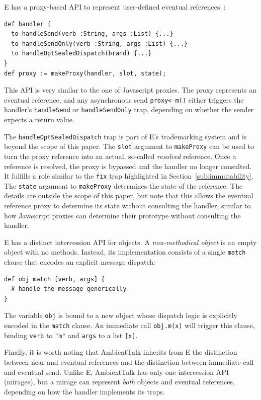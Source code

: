 \documentclass{acm_proc_article-sp}
\begin{document}
E has a proxy-based API to represent user-defined eventual references~\cite{eproxies}:

\begin{lstlisting}[]
def handler {
  to handleSend(verb :String, args :List) {...}
  to handleSendOnly(verb :String, args :List) {...}
  to handleOptSealedDispatch(brand) {...}
}
def proxy := makeProxy(handler, slot, state);
\end{lstlisting}

This API is very similar to the one of Javascript proxies. The proxy represents an eventual reference, and any asynchronous send \texttt{proxy<-m()} either triggers the handler's \texttt{handleSend} or \texttt{handleSendOnly} trap, depending on whether the sender expects a return value.

The \texttt{handleOptSealedDispatch} trap is part of E's trademarking system and is beyond the scope of this paper. The \texttt{slot} argument to \texttt{makeProxy} can be used to turn the proxy reference into an actual, so-called \emph{resolved} reference. Once a reference is resolved, the proxy is bypassed and the handler no longer consulted. It fulfills a role similar to the \texttt{fix} trap highlighted in Section~\ref{sub:immutability}. The \texttt{state} argument to \texttt{makeProxy} determines the state of the reference. The details are outside the scope of this paper, but note that this allows the eventual reference proxy to determine its state without consulting the handler, similar to how Javascript proxies can determine their prototype without consulting the handler.

E has a distinct intercession API for objects. A \emph{non-methodical object} is an empty object with no methods. Instead, its implementation consists of a single \texttt{match} clause that encodes an explicit message dispatch:

\begin{lstlisting}
def obj match [verb, args] {
  # handle the message generically
}
\end{lstlisting}

The variable \texttt{obj} is bound to a new object whose dispatch logic is explicitly encoded in the \texttt{match} clause. An immediate call \texttt{obj.m(x)} will trigger this clause, binding \texttt{verb} to \texttt{"m"} and \texttt{args} to a list \texttt{[x]}.

Finally, it is worth noting that AmbientTalk inherits from E the distinction between near and eventual references and the distinction between immediate call and eventual send. Unlike E, AmbientTalk has only one intercession API (mirages), but a mirage can represent \emph{both} objects and eventual references, depending on how the handler implements its traps.
\end{document}
